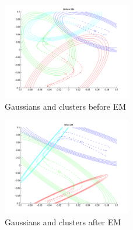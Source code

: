 \documentclass[conference]{IEEEtran}
\begin{document}
\begin{figure}[h!]
  	\centering
    \includegraphics[width=0.5\textwidth]{img/1before_em.png}
    \caption{Gaussians and clusters before EM}
    \label{fig:before_em}
\end{figure}

\begin{figure}[h!]
  	\centering
    \includegraphics[width=0.5\textwidth]{img/1after_em.png}
    \caption{Gaussians and clusters after EM}
    \label{fig:after_em}
\end{figure}
\newpage
~
\newpage
\end{document}
